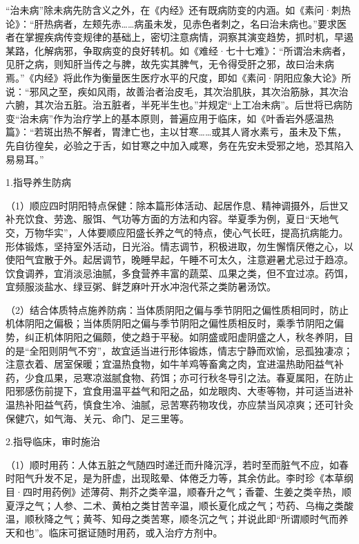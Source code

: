 \documentclass[draft,12pt]{ctexbook}
\begin{document}
“治未病”除未病先防含义之外，在《内经》还有既病防变的内涵。如《素问·刺热论》：“肝热病者，左颊先赤……病虽未发，见赤色者刺之，名曰治未病也。”要求医者在掌握疾病传变规律的基础上，密切注意病情，洞察其演变趋势，抓时机，早遏某路，化解病邪，争取病变的良好转机。如《难经·七十七难》：“所谓治未病者，见肝之病，则知肝当传之与脾，故先实其脾气，无令得受肝之邪，故曰治未病焉。”《内经》将此作为衡量医生医疗水平的尺度，即如《素问·阴阳应象大论》所说：“邪风之至，疾如风雨，故善治者治皮毛，其次治肌肤，其次治筋脉，其次治六腑，其次治五脏。治五脏者，半死半生也。”并规定“上工冶未病”。后世将已病防变“治未病”作为治疗学上的基本原则，普遍应用于临床，如《叶香岩外感温热篇》：“若斑出热不解者，胃津亡也，主以甘寒……或其人肾水素亏，虽未及下焦，先自彷徨矣，必验之于舌，如甘寒之中加入咸寒，务在先安未受邪之地，恐其陷入易易耳。”



1.指导养生防病

（1）顺应四时阴阳特点保健：除本篇形体活动、起居作息、精神调摄外，后世又补充饮食、劳逸、服饵、气功等方面的方法和内容。举夏季为例，夏日“天地气交，万物华实”，人体要顺应阳盛长养之气的特点，使心气长旺，提高抗病能力。形体锻炼，坚持室外活动，日光浴。情志调节，积极进取，勿生懈惰厌倦之心，以使阳气宜散于外。起居调节，晚睡早起，午睡不可太久，注意避暑尤忌过于趋凉。饮食调养，宜消淡忌油腻，多食营养丰富的蔬菜、瓜果之类，但不宜过凉。药饵，宜频服淡盐水、绿豆粥、鲜芝麻叶开水冲泡代茶之类防暑汤饮。

（2）结合体质特点施养防病：当体质阴阳之偏与季节阴阳之偏性质相同时，防止机体阴阳之偏极；当体质阴阳之偏与季节阴阳之偏性质相反时，乘季节阴阳之偏势，纠正机体阴阳之偏颇，使之趋于平秘。如阴盛或阳虚阴盛之人，秋冬养阴，目的是“全阳则阴气不穷”，故宜适当进行形体锻炼，情志宁静而欢愉，忌孤独凄凉；注意衣着、居室保暖；宜温热食物，如牛羊鸡等畜禽之肉，宜进温热助阳益气补药，少食瓜果，忌寒凉滋腻食物、药饵；亦可行秋冬导引之法。春夏属阳，在防止阳邪感伤前提下，宜食用温平益气和阳之品，如龙眼肉、大枣等物，并可适当进补温热补阳益气药，慎食生冷、油腻，忌苦寒药物攻伐，亦应禁当风凉爽；还可针灸保健穴，如气海、关元、命门、足三里等。

2.指导临床，审时施治

（1）顺时用药：人体五脏之气随四时递迁而升降沉浮，若时至而脏气不应，如春时阳气升发不足，是为肝虚，出现眩晕、体倦乏力等，其余仿此。李时珍《本草纲目·四时用药例》述薄荷、荆芥之类辛温，顺春升之气；香藿、生姜之类辛热，顺夏浮之气；人参、二术、黄柏之类甘苦辛温，顺长夏化成之气；芍药、乌梅之类酸温，顺秋降之气；黄芩、知母之类苦寒，顺冬沉之气；并说此即“所谓顺时气而养天和也”。临床可据证随时用药，或入治疗方剂中。
\end{document}
